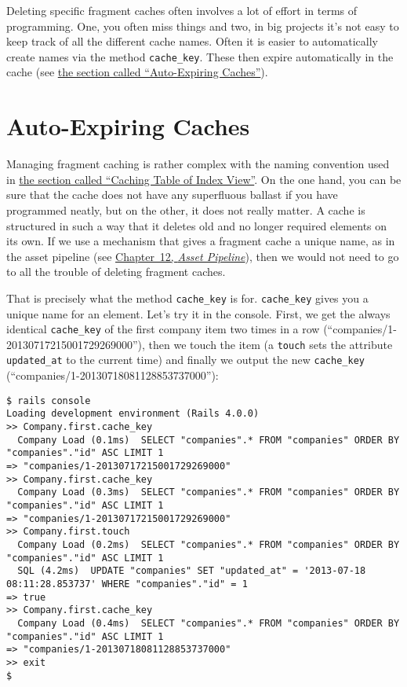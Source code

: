\documentclass[a4paper]{book}
\newcounter{tab}[chapter]
\newcommand{\chap}[1]{\newpage\thispagestyle{empty}\chapter{#1}\label{chap:\thechapter}}
\begin{document}
Deleting specific fragment caches often involves a lot of effort in terms of programming. One, you often miss things and two, in big projects it's not easy to keep track of all the different cache names. Often it is easier to automatically create names via the method \texttt{cache\_key}. These then expire automatically in the cache (see \hyperref[fragmentux5fautoux5fexpiring]{the section called “Auto-Expiring Caches”}).

\chap{Auto-Expiring Caches}\label{auto-expiring-caches}

Managing fragment caching is rather complex with the naming convention used in \hyperref[fragmentux5fcachingux5ftabelleux5fcachen]{the section called “Caching Table of Index View”}. On the one hand, you can be sure that the cache does not have any superfluous ballast if you have programmed neatly, but on the other, it does not really matter. A cache is structured in such a way that it deletes old and no longer required elements on its own. If we use a mechanism that gives a fragment cache a unique name, as in the asset pipeline (see \hyperref[assetux5fpipeline]{Chapter~12, \emph{Asset Pipeline}}), then we would not need to go to all the trouble of deleting fragment caches.

That is precisely what the method \texttt{cache\_key} is for. \texttt{cache\_key} gives you a unique name for an element. Let's try it in the console. First, we get the always identical \texttt{cache\_key} of the first company item two times in a row (“companies/1-20130717215001729269000”), then we touch the item (a \texttt{touch} sets the attribute \texttt{updated\_at} to the current time) and finally we output the new \texttt{cache\_key} (“companies/1-20130718081128853737000”):

\begin{shaded}\begin{verbatim}
$ rails console
Loading development environment (Rails 4.0.0)
>> Company.first.cache_key
  Company Load (0.1ms)  SELECT "companies".* FROM "companies" ORDER BY "companies"."id" ASC LIMIT 1
=> "companies/1-20130717215001729269000"
>> Company.first.cache_key
  Company Load (0.3ms)  SELECT "companies".* FROM "companies" ORDER BY "companies"."id" ASC LIMIT 1
=> "companies/1-20130717215001729269000"
>> Company.first.touch
  Company Load (0.2ms)  SELECT "companies".* FROM "companies" ORDER BY "companies"."id" ASC LIMIT 1
  SQL (4.2ms)  UPDATE "companies" SET "updated_at" = '2013-07-18 08:11:28.853737' WHERE "companies"."id" = 1
=> true
>> Company.first.cache_key
  Company Load (0.4ms)  SELECT "companies".* FROM "companies" ORDER BY "companies"."id" ASC LIMIT 1
=> "companies/1-20130718081128853737000"
>> exit
$
\end{verbatim}\end{shaded}
\end{document}

